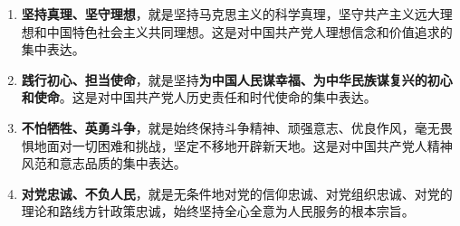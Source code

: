 \documentclass[10pt, UTF8]{book} %
\begin{document}
\begin{mdframed}[frametitle={伟大建党精神：中国共产党的精神之源}]
    \begin{enumerate}[itemsep=0pt]
        \item \textbf{坚持真理、坚守理想}，就是坚持马克思主义的科学真理，坚守共产主义远大理想和中国特色社会主义共同理想。这是对中国共产党人理想信念和价值追求的集中表达。
        \item \textbf{践行初心、担当使命}，就是坚持\textbf{为中国人民谋幸福、为中华民族谋复兴的初心和使命}。这是对中国共产党人历史责任和时代使命的集中表达。
        \item \textbf{不怕牺牲、英勇斗争}，就是始终保持斗争精神、顽强意志、优良作风，毫无畏惧地面对一切困难和挑战，坚定不移地开辟新天地。这是对中国共产党人精神风范和意志品质的集中表达。
        \item \textbf{对党忠诚、不负人民}，就是无条件地对党的信仰忠诚、对党组织忠诚、对党的理论和路线方针政策忠诚，始终坚持全心全意为人民服务的根本宗旨。
    \end{enumerate}
\end{mdframed}







\end{document}
